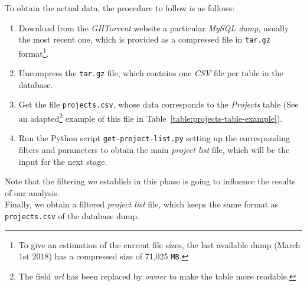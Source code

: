 \documentclass[a4paper, 12pt]{book}
\begin{document}
To obtain the actual data, the procedure to follow is as follows:
\begin{enumerate}
  \item Download from the \emph{GHTorrent} website a particular \emph{MySQL dump}, usually the most recent one, which is provided as a compressed file in \texttt{tar.gz}
        format\footnote{To give an estimation of the current file sizes, the last available dump (March 1st 2018) has a compressed size of 71,025 \texttt{MB}.}.
  \item Uncompress the \texttt{tar.gz} file, which contains one \emph{CSV} file per table in the database.
  \item Get the file \texttt{projects.csv}, whose data corresponds to the \emph{Projects} table (See an adapted\footnote{The field \emph{url} has been replaced by \emph{owner} to make the table more readable.}
  example of this file in Table~\ref{table:projects-table-example}).
  \item Run the Python script \texttt{get-project-list.py} setting up the corresponding filters and parameters to obtain the main
        \emph{project list} file, which will be the input for the next stage.
\end{enumerate}

Note that the filtering we establish in this phase is going to influence the results of our analysis.\\
Finally, we obtain a filtered \emph{project list} file, which keeps the same format as \texttt{projects.csv} of the database dump.
\end{document}
